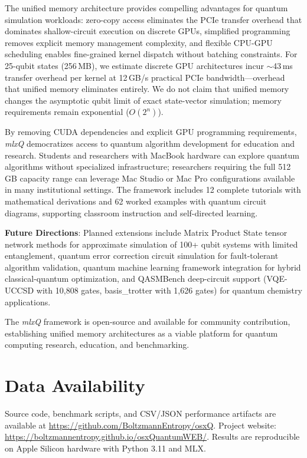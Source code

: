 \documentclass[runningheads]{llncs}
\newcommand{\mlxquantum}{\textit{mlxQ}\xspace}
\begin{document}
The unified memory architecture provides compelling advantages for quantum simulation workloads: zero-copy access eliminates the PCIe transfer overhead that dominates shallow-circuit execution on discrete GPUs, simplified programming removes explicit memory management complexity, and flexible CPU-GPU scheduling enables fine-grained kernel dispatch without batching constraints. For 25-qubit states (256\,MB), we estimate discrete GPU architectures incur $\sim$43\,ms transfer overhead per kernel at 12\,GB/s practical PCIe bandwidth---overhead that unified memory eliminates entirely. We do not claim that unified memory changes the asymptotic qubit limit of exact state-vector simulation; memory requirements remain exponential ($O(2^n)$).

By removing CUDA dependencies and explicit GPU programming requirements, \mlxquantum democratizes access to quantum algorithm development for education and research. Students and researchers with MacBook hardware can explore quantum algorithms without specialized infrastructure; researchers requiring the full 512\,GB capacity range can leverage Mac Studio or Mac Pro configurations available in many institutional settings. The framework includes 12 complete tutorials with mathematical derivations and 62 worked examples with quantum circuit diagrams, supporting classroom instruction and self-directed learning.

\textbf{Future Directions}: Planned extensions include Matrix Product State tensor network methods for approximate simulation of 100+ qubit systems with limited entanglement, quantum error correction circuit simulation for fault-tolerant algorithm validation, quantum machine learning framework integration for hybrid classical-quantum optimization, and QASMBench deep-circuit support (VQE-UCCSD with 10,808 gates, basis\_trotter with 1,626 gates) for quantum chemistry applications.

The \mlxquantum framework is open-source and available for community contribution, establishing unified memory architectures as a viable platform for quantum computing research, education, and benchmarking.

\section*{Data Availability}

Source code, benchmark scripts, and CSV/JSON performance artifacts are available at \url{https://github.com/BoltzmannEntropy/osxQ}. Project website: \url{https://boltzmannentropy.github.io/osxQuantumWEB/}. Results are reproducible on Apple Silicon hardware with Python 3.11 and MLX.



\end{document}

